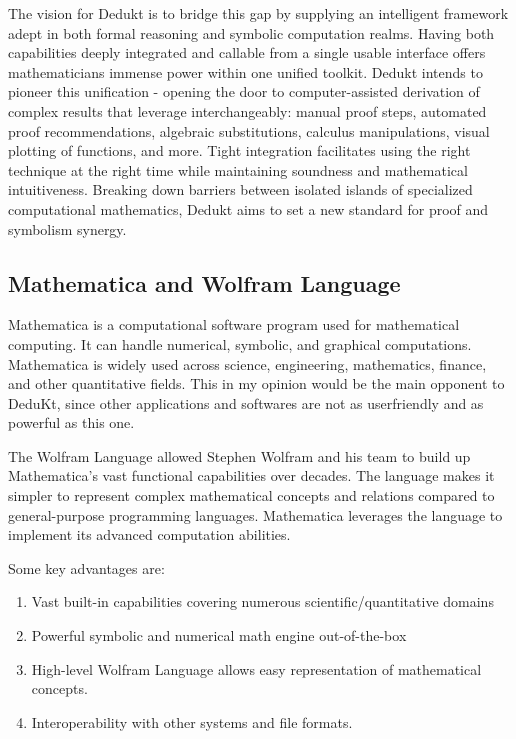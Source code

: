 \documentclass[9pt,a4paper,twocolumn]{article}
\begin{document}
    The vision for Dedukt is to bridge this gap by supplying an intelligent framework adept in both formal reasoning and symbolic computation realms. Having both capabilities deeply integrated and callable from a single usable interface offers mathematicians immense power within one unified toolkit. Dedukt intends to pioneer this unification - opening the door to computer-assisted derivation of complex results that leverage interchangeably: manual proof steps, automated proof recommendations, algebraic substitutions, calculus manipulations, visual plotting of functions, and more. Tight integration facilitates using the right technique at the right time while maintaining soundness and mathematical intuitiveness. Breaking down barriers between isolated islands of specialized computational mathematics, Dedukt aims to set a new standard for proof and symbolism synergy.

    \subsection{Mathematica and Wolfram Language}
            Mathematica is a computational software program used for mathematical computing. It can handle numerical, symbolic, and graphical computations. Mathematica is widely used across science, engineering, mathematics, finance, and other quantitative fields. This in my opinion would be the main opponent to DeduKt, since other applications and softwares are not as userfriendly and as powerful as this one.

            The Wolfram Language allowed Stephen Wolfram and his team to build up Mathematica's vast functional capabilities over decades. The language makes it simpler to represent complex mathematical concepts and relations compared to general-purpose programming languages. Mathematica leverages the language to implement its advanced computation abilities.
            
            Some key advantages are:
            \begin{enumerate}
                \item Vast built-in capabilities covering numerous scientific/quantitative domains
                \item Powerful symbolic and numerical math engine out-of-the-box
                \item  High-level Wolfram Language allows easy representation of mathematical concepts.
                \item Interoperability with other systems and file formats.
            \end{enumerate}
                        
\end{document}
